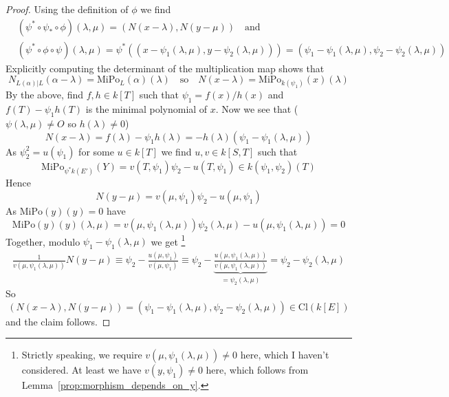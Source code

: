 \documentclass{scrartcl}
\renewcommand{\O}{O}
\theoremstyle{definition}
\begin{document}
\begin{proof}
    Using the definition of $\phi$ we find
    \begin{align*}
        &(\psi^* \circ \psi_* \circ \phi)(\lambda, \mu) = ( N(x - \lambda), N(y - \mu) ) \quad \text{and} \\
        &(\psi^* \circ \phi \circ \psi)(\lambda, \mu) = \psi^*\left(( x - \psi_1(\lambda, \mu), y - \psi_2(\lambda, \mu) )\right)  = ( \psi_1 - \psi_1(\lambda, \mu), \psi_2 - \psi_2(\lambda, \mu) )
    \end{align*}
    Explicitly computing the determinant of the multiplication map shows that
    \begin{equation*}
        N_{L(\alpha)|L}(\alpha - \lambda) = \mathrm{MiPo}_L(\alpha)(\lambda) \quad \text{so} \quad N(x - \lambda) = \mathrm{MiPo}_{k(\psi_1)}(x)(\lambda)
    \end{equation*}
    By the above, find $f, h \in k[T]$ such that $\psi_1 = f(x)/h(x)$ and $f(T) - \psi_1h(T)$ is the minimal polynomial of $x$.
    Now we see that ($\psi(\lambda, \mu) \neq \O$ so $h(\lambda) \neq 0$)
    \begin{equation*}
        N(x - \lambda) = f(\lambda) - \psi_1h(\lambda) = -h(\lambda)(\psi_1 - \psi_1(\lambda, \mu))
    \end{equation*}
    As $\psi_2^2 = u(\psi_1)$ for some $u \in k[T]$ we find $u, v \in k[S, T]$ such that
    \begin{equation*}
        \mathrm{MiPo}_{\psi^*k(E')}(Y) = v(T, \psi_1)\psi_2 - u(T, \psi_1) \in k(\psi_1, \psi_2)(T)
    \end{equation*}
    Hence
    \begin{equation*}
        N(y - \mu) = v(\mu, \psi_1)\psi_2 - u(\mu, \psi_1)
    \end{equation*}
    As $\mathrm{MiPo}(y)(y) = 0$ have
    \begin{equation*}
        \mathrm{MiPo}(y)(y)(\lambda, \mu) = v(\mu, \psi_1(\lambda, \mu))\psi_2(\lambda, \mu) - u(\mu, \psi_1(\lambda, \mu)) = 0
    \end{equation*}
    Together, modulo $\psi_1 - \psi_1(\lambda, \mu)$ we get
    \footnote{Strictly speaking, we require $v(\mu, \psi_1(\lambda, \mu)) \neq 0$ here, which I haven't considered.
    At least we have $v(y, \psi_1) \neq 0$ here, which follows from Lemma~\ref{prop:morphism_depends_on_y}.}
    \begin{align*}
        \frac 1 {v(\mu, \psi_1(\lambda, \mu))} N(y - \mu) \equiv \psi_2 - \frac {u(\mu, \psi_1)} {v(\mu, \psi_1)} \equiv \psi_2 - \underbrace{\frac {u(\mu, \psi_1(\lambda, \mu))} {v(\mu, \psi_1(\lambda, \mu))}}_{= \psi_2(\lambda, \mu)} = \psi_2 - \psi_2(\lambda, \mu)
    \end{align*}
    So
    \begin{equation*}
        ( N(x - \lambda), N(y - \mu) ) = ( \psi_1 - \psi_1(\lambda, \mu), \psi_2 - \psi_2(\lambda, \mu) ) \in \mathrm{Cl}(k[E])
    \end{equation*}
    and the claim follows.
\end{proof}
\end{document}
